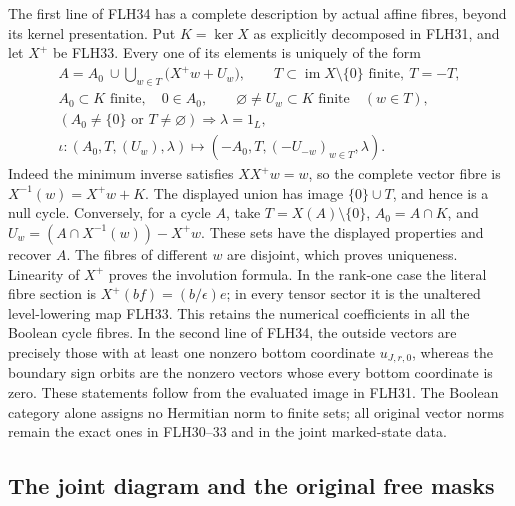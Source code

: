 The first line of FLH34 has a complete description by actual
affine fibres, beyond its kernel presentation. Put \(K=\ker X\)
as explicitly decomposed in FLH31, and let \(X^+\) be FLH33.
Every one of its elements is uniquely of the form
\[
\begin{gathered}
A=A_0\ \cup\!
       \bigcup_{w\in T}\bigl(X^+w+U_w\bigr),\qquad
T\subset\operatorname{im}X\setminus\{0\}\text{ finite},\
T=-T,\\
A_0\subset K\text{ finite},\quad0\in A_0,\qquad
\varnothing\ne U_w\subset K\text{ finite}\quad(w\in T),\\
(A_0\ne\{0\}\text{ or }T\ne\varnothing)
                  \Rightarrow\lambda=1_L,\\
\iota:(A_0,T,(U_w),\lambda)
       \longmapsto(-A_0,T,(-U_{-w})_{w\in T},\lambda).
\end{gathered}\tag{FLH35}
\]
Indeed the minimum inverse satisfies \(XX^+w=w\), so
the complete vector fibre is \(X^{-1}(w)=X^+w+K\).
The displayed union has image \(\{0\}\cup T\), and hence
is a null cycle. Conversely, for a cycle \(A\), take
\(T=X(A)\setminus\{0\}\), \(A_0=A\cap K\), and
\(U_w=(A\cap X^{-1}(w))-X^+w\).
These sets have the displayed properties and recover \(A\).
The fibres of different \(w\) are disjoint, which proves
uniqueness. Linearity of \(X^+\) proves the involution formula.
In the rank-one case the literal fibre section is
\(X^+(bf)=(b/\epsilon)e\); in every tensor sector it is
the unaltered level-lowering map FLH33.
This retains the numerical coefficients in all the Boolean
cycle fibres. In the second line of FLH34, the outside vectors
are precisely those with at least one nonzero bottom coordinate
\(u_{J,r,0}\), whereas the boundary sign orbits are the nonzero
vectors whose every bottom coordinate is zero.
These statements follow from the evaluated image in FLH31.
The Boolean category alone assigns no Hermitian norm to
finite sets; all original vector norms remain the exact
ones in FLH30--33 and in the joint marked-state data.

\subsection{The joint diagram and the original free masks}

